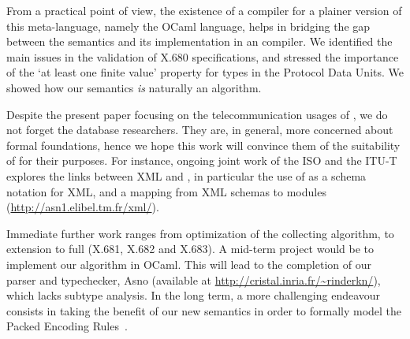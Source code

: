 From a practical point of view, the existence of a compiler for a
plainer version of this meta-language, namely the OCaml language,
helps in bridging the gap between the semantics and its implementation
in an \ASN compiler. We identified the main issues in the validation
of \mbox{X.680} specifications, and stressed the importance of the `at
least one finite value' property for types in the Protocol Data
Units. We showed how our semantics \emph{is} naturally an algorithm.

Despite the present paper focusing on the telecommunication usages of
\ASN, we do not forget the database researchers. They are, in general,
more concerned about formal foundations, hence we hope this work will
convince them of the suitability of \ASN for their purposes. For
instance, ongoing joint work of the ISO and the ITU-T explores the
links between XML and \ASN, in particular the use of \ASN as a schema
notation for XML, and a mapping from XML schemas to \ASN modules
(\url{http://asn1.elibel.tm.fr/xml/}).

Immediate further work ranges from optimization of the collecting
algorithm, to extension to full \ASN (\mbox{X.681}, \mbox{X.682} and
\mbox{X.683}). A mid-term project would be to implement our algorithm
in OCaml. This will lead to the completion of our parser and
typechecker, \textsf{Asno} (available at
{\small\url{http://cristal.inria.fr/~rinderkn/}}), which lacks subtype
analysis. In the long term, a more challenging endeavour consists in
taking the benefit of our new semantics in order to formally model the
Packed Encoding Rules~\cite{X.691:2002}.

